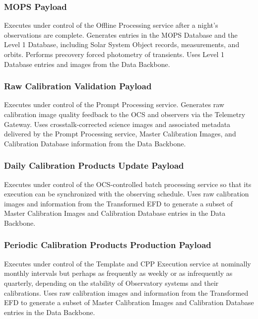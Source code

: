 \documentclass[DM,toc]{lsstdoc}
\begin{document}
\subsubsection{MOPS Payload}\label{mops-payload}

Executes under control of the Offline Processing service after a night's
observations are complete. Generates entries in the MOPS Database and
the Level 1 Database, including Solar System Object records,
measurements, and orbits. Performs precovery forced photometry of
transients. Uses Level 1 Database entries and images from the Data
Backbone.

\subsubsection{Raw Calibration Validation
Payload}\label{raw-calibration-validation-payload}

Executes under control of the Prompt Processing service. Generates raw
calibration image quality feedback to the OCS and observers via the
Telemetry Gateway. Uses crosstalk-corrected science images and
associated metadata delivered by the Prompt Processing service, Master
Calibration Images, and Calibration Database information from the Data
Backbone.

\subsubsection{Daily Calibration Products Update
Payload}\label{daily-calibration-products-update-payload}

Executes under control of the OCS-controlled batch processing service so
that its execution can be synchronized with the observing schedule. Uses
raw calibration images and information from the Transformed EFD to
generate a subset of Master Calibration Images and Calibration Database
entries in the Data Backbone.

\subsubsection{Periodic Calibration Products Production
Payload}\label{periodic-calibration-products-production-payload}

Executes under control of the Template and CPP Execution service at
nominally monthly intervals but perhaps as frequently as weekly or as
infrequently as quarterly, depending on the stability of Observatory
systems and their calibrations. Uses raw calibration images and
information from the Transformed EFD to generate a subset of Master
Calibration Images and Calibration Database entries in the Data
Backbone.
\end{document}

